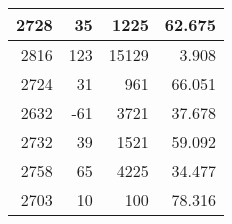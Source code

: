 \begin{longtable}{|r|r|r|r|}
		2728                                                                                               & 35                                                     & 1225                                                            & 62.675                                                                                                               \\ \hline
		2816                                                                                               & 123                                                    & 15129                                                           & 3.908                                                                                                                \\ \hline
		2724                                                                                               & 31                                                     & 961                                                             & 66.051                                                                                                               \\ \hline
		2632                                                                                               & -61                                                    & 3721                                                            & 37.678                                                                                                               \\ \hline
		2732                                                                                               & 39                                                     & 1521                                                            & 59.092                                                                                                               \\ \hline
		2758                                                                                               & 65                                                     & 4225                                                            & 34.477                                                                                                               \\ \hline
		2703                                                                                               & 10                                                     & 100                                                             & 78.316                                                                                                               \\ \hline

\end{longtable}

